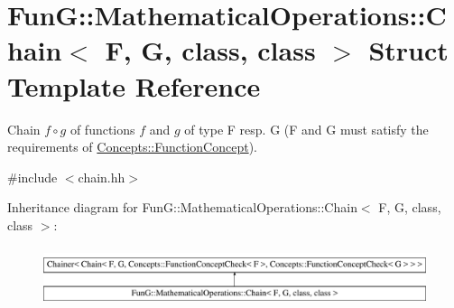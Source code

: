 \hypertarget{structFunG_1_1MathematicalOperations_1_1Chain}{\section{Fun\-G\-:\-:Mathematical\-Operations\-:\-:Chain$<$ F, G, class, class $>$ Struct Template Reference}
\label{structFunG_1_1MathematicalOperations_1_1Chain}
}


Chain $ f\circ g $ of functions $f$ and $g$ of type F resp. G (F and G must satisfy the requirements of \hyperlink{structFunG_1_1Concepts_1_1FunctionConcept}{Concepts\-::\-Function\-Concept}).  




{\ttfamily \#include $<$chain.\-hh$>$}

Inheritance diagram for Fun\-G\-:\-:Mathematical\-Operations\-:\-:Chain$<$ F, G, class, class $>$\-:\begin{figure}[H]
\begin{center}
\leavevmode
\includegraphics[height=1.758242cm]{structFunG_1_1MathematicalOperations_1_1Chain}
\end{center}
\end{figure}
